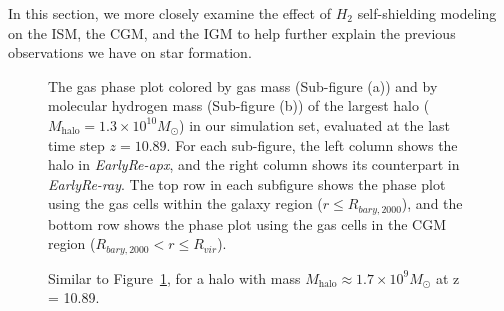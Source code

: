 \documentclass[linenumbers, twocolumn]{aastex631}
\begin{document}
In this section, we more closely examine the effect of $H_{2}$ self-shielding modeling on the ISM, the CGM, and the IGM to help further explain the previous observations we have on star formation.

\begin{figure}
    \caption{The gas phase plot colored by gas mass (Sub-figure (a)) and by molecular hydrogen mass (Sub-figure (b)) of the largest halo ($M_{\mathrm{halo}} = 1.3\times10^{10} M_\odot$) in our simulation set, evaluated at the last time step $z = 10.89$. For each sub-figure, the left column shows the halo in \textit{EarlyRe-apx}, and the right column shows its counterpart in \textit{EarlyRe-ray}. The top row in each subfigure shows the phase plot using the gas cells within the galaxy region ($r \leq R_{bary,2000}$), and the bottom row shows the phase plot using the gas cells in the CGM region ($R_{bary,2000} < r \leq R_{vir}$).} 
    \label{fig:phaseplot_Halo0-0}
\end{figure}

\begin{figure}
    \caption{Similar to Figure~\ref{fig:phaseplot_Halo0-0}, for a halo with mass $M_{\mathrm{halo}} \approx 1.7\times 10^{9} M_\odot$ at z = 10.89.}
    \label{fig:phaseplot_Halo8-9}
\end{figure}
\end{document}
